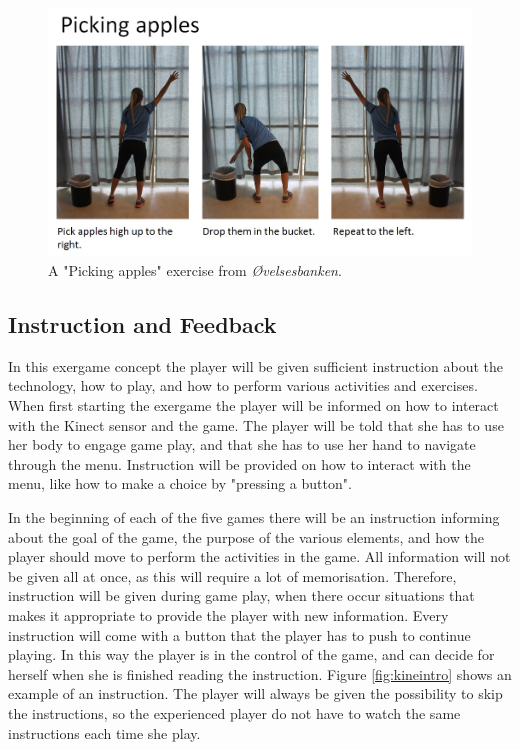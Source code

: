 \begin{figure} [H]
\centering
\includegraphics[scale=0.5]{PickingApplesAlone.jpg}
\caption[Exercise - picking apples]{A "Picking apples" exercise from \emph{Øvelsesbanken}.}
\label{pickingapples}
\end{figure}

\subsection{Instruction and Feedback}
In this exergame concept the player will be given sufficient instruction about the technology, how to play, and how to perform various activities and exercises. When first starting the exergame the player will be informed on how to interact with the Kinect sensor and the game. The player will be told that she has to use her body to engage game play, and that she has to use her hand to navigate through the menu. Instruction will be provided on how to interact with the menu, like how to make a choice by "pressing a button". 

In the beginning of each of the five games there will be an instruction informing about the goal of the game, the purpose of the various elements, and how the player should move to perform the activities in the game. All information will not be given all at once, as this will require a lot of memorisation. Therefore, instruction will be given during game play, when there occur situations that makes it appropriate to provide the player with new information. Every instruction will come with a button that the player has to push to continue playing. In this way the player is in the control of the game, and can decide for herself when she is finished reading the instruction. Figure \ref{fig:kineintro} shows an example of an instruction. The player will always be given the possibility to skip the instructions, so the experienced player do not have to watch the same instructions each time she play.

